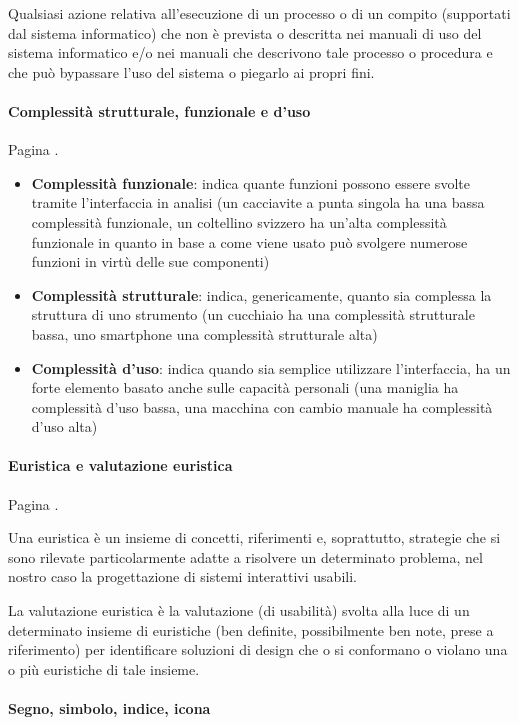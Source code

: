 \documentclass[11pt,a4paper]{book}
\begin{document}
Qualsiasi azione relativa all'esecuzione di un processo o di un compito (supportati dal sistema informatico) che non è prevista o descritta nei manuali di uso del sistema informatico e/o nei manuali che descrivono tale processo o procedura e che può bypassare l'uso del sistema o piegarlo ai propri fini.

\paragraph{Complessità strutturale, funzionale e d'uso}
Pagina \pageref{par: complessità}.

\begin{itemize}
	\item \textbf{Complessità funzionale}: indica quante funzioni possono essere svolte tramite l'interfaccia in analisi (un cacciavite a punta singola ha una bassa complessità funzionale, un coltellino svizzero ha un'alta complessità funzionale in quanto in base a come viene usato può svolgere numerose funzioni in virtù delle sue componenti)
	\item \textbf{Complessità strutturale}: indica, genericamente, quanto sia complessa la struttura di uno strumento (un cucchiaio ha una complessità strutturale bassa, uno smartphone una complessità strutturale alta)
	\item \textbf{Complessità d'uso}: indica quando sia semplice utilizzare l'interfaccia, ha un forte elemento basato anche sulle capacità personali (una maniglia ha complessità d'uso bassa, una macchina con cambio manuale ha complessità d'uso alta)
\end{itemize}

\paragraph{Euristica e valutazione euristica}
Pagina \pageref{par: euristica}.

Una euristica è un insieme di concetti, riferimenti e, soprattutto, strategie che si sono rilevate particolarmente adatte a risolvere un determinato problema, nel nostro caso la progettazione di sistemi interattivi usabili.

La valutazione euristica è la valutazione (di usabilità) svolta alla luce di un determinato insieme di euristiche (ben definite, possibilmente ben note, prese a riferimento) per identificare soluzioni di design che o si conformano o violano una o più euristiche di tale insieme.

\paragraph{Segno, simbolo, indice, icona}
\end{document}
